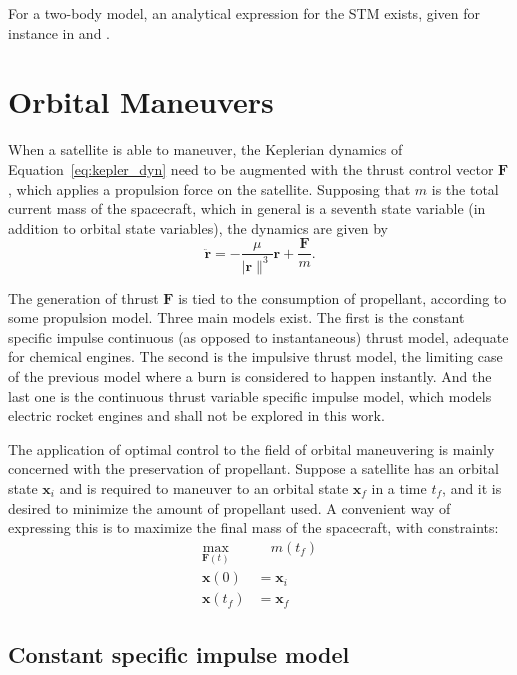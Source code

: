 For a two-body model, an analytical expression for the STM exists, given for instance in  and . 

\section{Orbital Maneuvers}

When a satellite is able to maneuver, the Keplerian dynamics of Equation~\eqref{eq:kepler_dyn} need to be augmented with the thrust control vector \(\mathbf{F}\), which applies a propulsion force on the satellite. Supposing that \(m\) is the total current mass of the spacecraft, which in general is a seventh state variable (in addition to orbital state variables), the dynamics are given by
\begin{equation}
    \ddot{\mathbf{r}} = -\frac{\mu}{\lvert \mathbf{r} \rVert^3}\mathbf{r} + \frac{\mathbf{F}}{m}.
\end{equation}

The generation of thrust \(\mathbf{F}\) is tied to the consumption of propellant, according to some propulsion model. Three main models exist. The first is the constant specific impulse continuous (as opposed to instantaneous) thrust model, adequate for chemical engines. The second is the impulsive thrust model, the limiting case of the previous model where a burn is considered to happen instantly. And the last one is the continuous thrust variable specific impulse model, which models electric rocket engines and shall not be explored in this work.

The application of optimal control to the field of orbital maneuvering is mainly concerned with the preservation of propellant. Suppose a satellite has an orbital state \(\mathbf{x}_i\) and is required to maneuver to an orbital state \(\mathbf{x}_f\) in a time \(t_f\), and it is desired to minimize the amount of propellant used. A convenient way of expressing this is to maximize the final mass of the spacecraft, with constraints:
\begin{align}
    \max_{\mathbf{F}(t)}&\quad m(t_f) \label{eq:max_final_mass} \\
    \mathbf{x}(0) &= \mathbf{x}_i \\
    \mathbf{x}(t_f) &= \mathbf{x}_f
\end{align}

\subsection{Constant specific impulse model}

